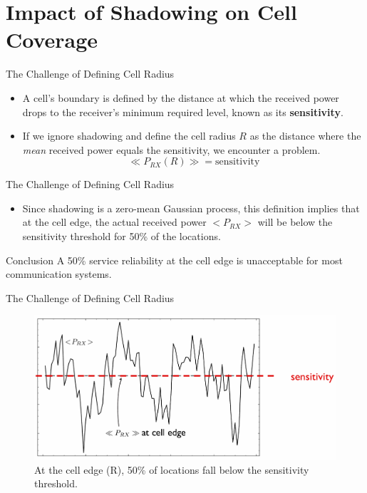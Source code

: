 \documentclass{beamer}
\begin{document}
	\section{Impact of Shadowing on Cell Coverage}
	
	\begin{frame}{The Challenge of Defining Cell Radius}
		\begin{itemize}
			\item A cell's boundary is defined by the distance at which the received power drops to the receiver's minimum required level, known as its \textbf{sensitivity}.
			\item If we ignore shadowing and define the cell radius $R$ as the distance where the \textit{mean} received power equals the sensitivity, we encounter a problem.
			\[ \ll P_{RX}(R) \gg = \text{sensitivity} \]
		
		\end{itemize}
		
	\end{frame}
	
	\begin{frame}{The Challenge of Defining Cell Radius}
		\begin{itemize}
		
			\item Since shadowing is a zero-mean Gaussian process, this definition implies that at the cell edge, the actual received power $<P_{RX}>$ will be below the sensitivity threshold for 50\% of the locations.
		\end{itemize}
		\begin{alertblock}{Conclusion}
			A 50\% service reliability at the cell edge is unacceptable for most communication systems.
		\end{alertblock}
	\end{frame}
	
	\begin{frame}{The Challenge of Defining Cell Radius}
		\begin{figure}
			\centering
			\includegraphics[width=0.9\linewidth]{"pictures/50-percent-problem.png"}
			\caption{At the cell edge (R), 50\% of locations fall below the sensitivity threshold.}
		\end{figure}
	\end{frame}
	
\end{document}
